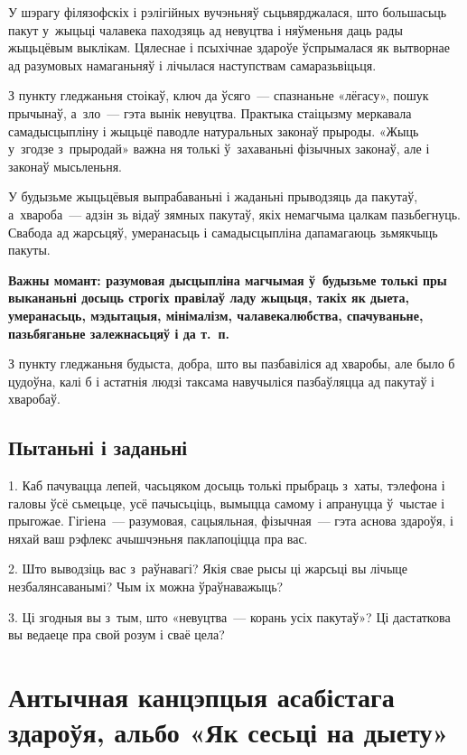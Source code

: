 У шэрагу філязофскіх і рэлігійных вучэньняў сьцьвярджалася, што большасьць пакут у~жыцьці чалавека паходзяць ад невуцтва і няўменьня даць рады жыцьцёвым выклікам. Цялеснае і псыхічнае здароўе ўспрымалася як вытворнае ад разумовых намаганьняў і лічылася наступствам самаразьвіцьця.

З пункту гледжаньня стоікаў, ключ да ўсяго~--- спазнаньне «лёгасу», пошук прычынаў, а~зло~--- гэта вынік невуцтва. Практыка стаіцызму меркавала самадысцыпліну і жыцьцё паводле натуральных законаў прыроды. «Жыць у~згодзе з~прыродай» важна ня толькі ў~захаваньні фізычных законаў, але і законаў мысьленьня.

У будызьме жыцьцёвыя выпрабаваньні і жаданьні прыводзяць да пакутаў, а~хвароба~--- адзін зь відаў зямных пакутаў, якіх немагчыма цалкам пазьбегнуць. Свабода ад жарсьцяў, умеранасьць і самадысцыпліна дапамагаюць зьмякчыць пакуты.

\textbf{Важны момант: разумовая дысцыпліна магчымая ў~будызьме толькі пры выкананьні досыць строгіх правілаў ладу жыцьця, такіх як дыета, умеранасьць, мэдытацыя, мінімалізм, чалавекалюбства, спачуваньне, пазьбяганьне залежнасьцяў і да т.~п.} 

З пункту гледжаньня будыста, добра, што вы пазбавіліся ад хваробы, але было б цудоўна, калі б і астатнія людзі таксама навучыліся пазбаўляцца ад пакутаў і хваробаў.

\subsection*{Пытаньні і заданьні}

1. Каб пачувацца лепей, часьцяком досыць толькі прыбраць з~хаты, тэлефона і галовы ўсё сьмецьце, усё пачысьціць, вымыцца самому і апрануцца ў~чыстае і прыгожае. Гігіена~--- разумовая, сацыяльная, фізычная~--- гэта аснова здароўя, і няхай ваш рэфлекс ачышчэньня паклапоціцца пра вас.

2. Што выводзіць вас з~раўнавагі? Якія свае рысы ці жарсьці вы лічыце незбалянсаванымі? Чым іх можна ўраўнаважыць?

3. Ці згодныя вы з~тым, што «невуцтва~--- корань усіх пакутаў»? Ці дастаткова вы ведаеце пра свой розум і сваё цела?


\section[Антычная канцэпцыя асабістага здароўя, альбо «Як сесьці на дыету»][Антычная канцэпцыя асабістага здароўя]{Антычная канцэпцыя асабістага здароўя, альбо «Як сесьці на дыету»}

